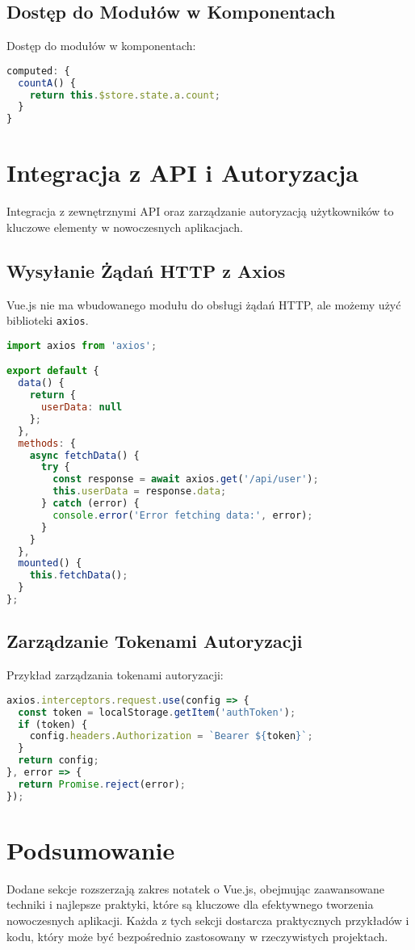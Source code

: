 \documentclass[a4paper,12pt]{article}
\begin{document}
\subsection{Dostęp do Modułów w Komponentach}
Dostęp do modułów w komponentach:

\begin{lstlisting}[language=JavaScript]
computed: {
  countA() {
    return this.$store.state.a.count;
  }
}
\end{lstlisting}

\section{Integracja z API i Autoryzacja}
Integracja z zewnętrznymi API oraz zarządzanie autoryzacją użytkowników to kluczowe elementy w nowoczesnych aplikacjach.

\subsection{Wysyłanie Żądań HTTP z Axios}
Vue.js nie ma wbudowanego modułu do obsługi żądań HTTP, ale możemy użyć biblioteki \texttt{axios}.

\begin{lstlisting}[language=JavaScript]
import axios from 'axios';

export default {
  data() {
    return {
      userData: null
    };
  },
  methods: {
    async fetchData() {
      try {
        const response = await axios.get('/api/user');
        this.userData = response.data;
      } catch (error) {
        console.error('Error fetching data:', error);
      }
    }
  },
  mounted() {
    this.fetchData();
  }
};
\end{lstlisting}

\subsection{Zarządzanie Tokenami Autoryzacji}
Przykład zarządzania tokenami autoryzacji:

\begin{lstlisting}[language=JavaScript]
axios.interceptors.request.use(config => {
  const token = localStorage.getItem('authToken');
  if (token) {
    config.headers.Authorization = `Bearer ${token}`;
  }
  return config;
}, error => {
  return Promise.reject(error);
});
\end{lstlisting}

\section{Podsumowanie}
Dodane sekcje rozszerzają zakres notatek o Vue.js, obejmując zaawansowane techniki i najlepsze praktyki, które są kluczowe dla efektywnego tworzenia nowoczesnych aplikacji. Każda z tych sekcji dostarcza praktycznych przykładów i kodu, który może być bezpośrednio zastosowany w rzeczywistych projektach.
\end{document}
